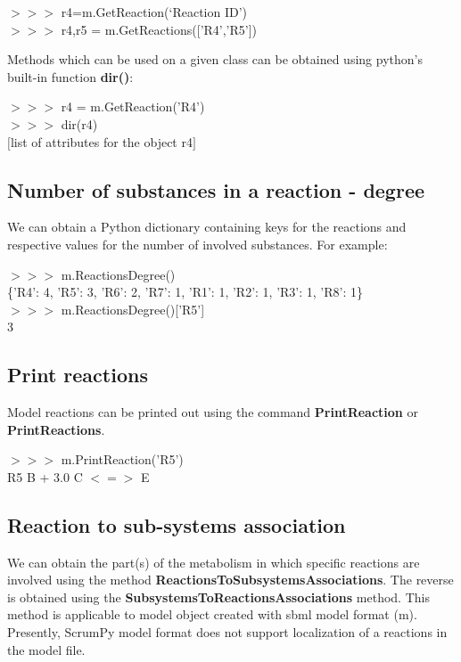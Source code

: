 \begin{framed}
$>>>$ r4=m.GetReaction(`Reaction ID')\\
$>>>$ r4,r5 = m.GetReactions(['R4','R5'])
\end{framed}

Methods which can be used on a given class can be obtained using python's built-in function \textbf{dir()}:
\begin{framed}
$>>>$ r4 = m.GetReaction('R4')\\
$>>>$ dir(r4)\\
$[$list of attributes for the object r4$]$
\end{framed}


\subsection{Number of substances in a reaction - degree}

We can obtain a Python dictionary containing keys for the reactions and respective values for the number of involved substances. For example:

\begin{framed}
$>>>$ m.ReactionsDegree()\\
\{'R4': 4, 'R5': 3, 'R6': 2, 'R7': 1, 'R1': 1, 'R2': 1, 'R3': 1, 'R8': 1\}\\

$>>>$ m.ReactionsDegree()['R5']\\
3
\end{framed}


\subsection{Print reactions}
Model reactions can be printed out using the command \textbf{PrintReaction} or \textbf{PrintReactions}.

\begin{framed}
$>>>$ m.PrintReaction('R5')\\ 
R5 \space B + 3.0 C $<=>$ E
\end{framed}


\subsection{Reaction to sub-systems association}
We can obtain the part(s) of the metabolism in which specific reactions are involved using the method \textbf{ReactionsToSubsystemsAssociations}. The reverse is obtained using the \textbf{SubsystemsToReactionsAssociations} method. This method is applicable to model object created with sbml model format (m). Presently, ScrumPy model format does not support localization of a reactions in the model file.

